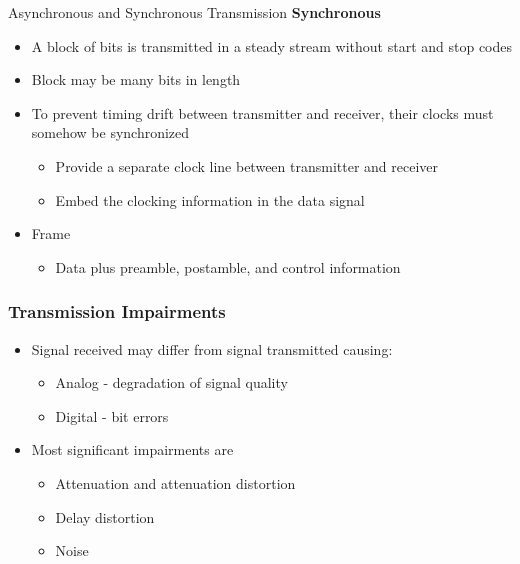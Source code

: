 \documentclass[pdflatex,compress]{beamer}
\begin{document}
\begin{frame}{Asynchronous and Synchronous Transmission}
	\textbf{Synchronous}
	\begin{itemize}
		\item A block of bits is transmitted in a steady stream without start and stop codes
		\item Block may be many bits in length
		\item To prevent timing drift between transmitter and receiver, their clocks must somehow be synchronized
		\begin{itemize}
			\item Provide a separate clock line between transmitter and receiver
			\item Embed the clocking information in the data signal
		\end{itemize}
		\item Frame
		\begin{itemize}
			\item Data plus preamble, postamble, and control information
		\end{itemize}
	\end{itemize}
\end{frame}

\begin{frame}
	\frametitle{Transmission Impairments}
	\begin{itemize}
		\item  Signal received may differ from signal
		transmitted causing:
		\begin{itemize}
			\item Analog - degradation of signal quality
			\item Digital - bit errors
		\end{itemize}
		\item Most significant impairments are
		\begin{itemize}
			\item Attenuation and attenuation distortion
			\item Delay distortion
			\item Noise
		\end{itemize}
	\end{itemize}
\end{frame}
\end{document}
